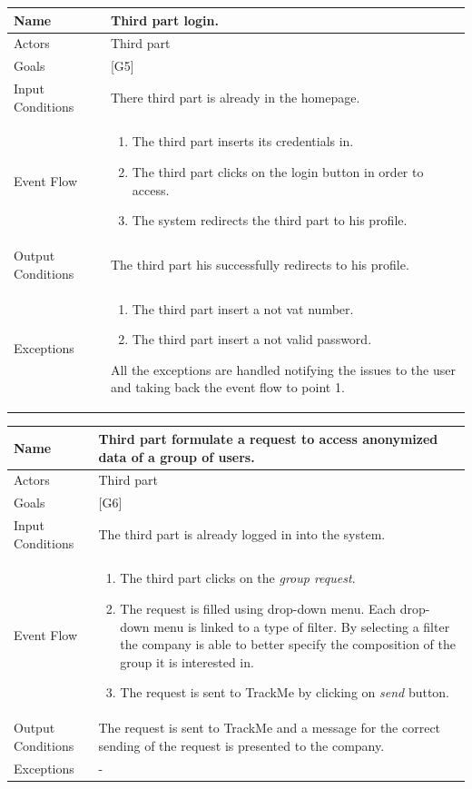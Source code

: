 \documentclass{article}
\begin{document}
\begin{center}
    \begin{tabular}{ | l | p{10cm} |}
    \hline
    Name & Third part login.\\ \hline
    Actors & Third part\\ \hline
   	Goals & {[G5]}\\ \hline
    Input Conditions & There third part is already in the homepage.\\ \hline
    Event Flow & \begin{enumerate}
    	\item The third part inserts its credentials in.
		\item The third part clicks on the login button in order to access.
		\item The system redirects the third part to his profile.
    \end{enumerate} \\ \hline
    Output Conditions & The third part his successfully redirects to his profile.  \\ \hline
    Exceptions & \begin{enumerate}
   \item The third part insert a not vat number.
	\item The third part insert a not valid password.
\end{enumerate} All the exceptions are handled notifying the issues to the user and taking back the event flow to point 1.    \\ \hline
    \end{tabular}
\end{center}

\begin{center}
    \begin{tabular}{ | l | p{10cm} |}
    \hline
    Name & Third part formulate a request to access anonymized data of a group of users.\\ \hline
    Actors & Third part\\ \hline
   	Goals & {[G6]}\\ \hline
    Input Conditions & The third part is already logged in into the system.\\ \hline
    Event Flow & \begin{enumerate}
    	\item The third part clicks on the \emph{group request}.
    	\item The request is filled using drop-down menu. Each drop-down menu is linked to a type of filter. By selecting a filter the company is able to better specify the composition of the group it is interested in.
		\item The request is sent to TrackMe by clicking on \emph{send} button. 
    \end{enumerate} \\ \hline
    Output Conditions & The request is sent to TrackMe and a message for the correct sending of the request is presented to the company. \\ \hline
    Exceptions & -   \\ \hline
    \end{tabular}
\end{center}
\end{document}
